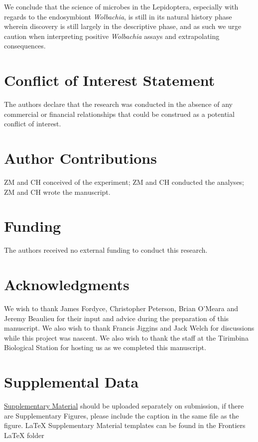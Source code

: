\documentclass{frontiersSCNS}
\begin{document}
\citet{vanNieukerken:2011a123}

\citet{Jiggins:2001p7754}

\citet{Jiggins:2001uo}


We conclude that the science of microbes in the Lepidoptera, especially with regards to the endosymbiont \textit{Wolbachia}, is still in its natural history phase wherein discovery is still largely in the descriptive phase, and as such we urge caution when interpreting positive \textit{Wolbachia} assays and extrapolating consequences. 



\newpage


\section*{Conflict of Interest Statement}
The authors declare that the research was conducted in the absence of any commercial or financial relationships that could be construed as a potential conflict of interest.


\section*{Author Contributions}
ZM and CH conceived of the experiment; ZM and CH conducted the analyses; ZM and CH wrote the manuscript. 

\section*{Funding}
The authors received no external funding to conduct this research.

\section*{Acknowledgments}
We wish to thank James Fordyce, Christopher Peterson, Brian O'Meara and Jeremy Beaulieu for their input and advice during the preparation of this manuscript. We also wish to thank Francis Jiggins and Jack Welch for discussions while this project was nascent. We also wish to thank the staff at the Tirimbina Biological Station for hosting us as we completed this manuscript. 

\section*{Supplemental Data}
 \href{http://home.frontiersin.org/about/author-guidelines#SupplementaryMaterial}{Supplementary Material} should be uploaded separately on submission, if there are Supplementary Figures, please include the caption in the same file as the figure. LaTeX Supplementary Material templates can be found in the Frontiers LaTeX folder 
\newpage
 

\newpage 
\end{document}

